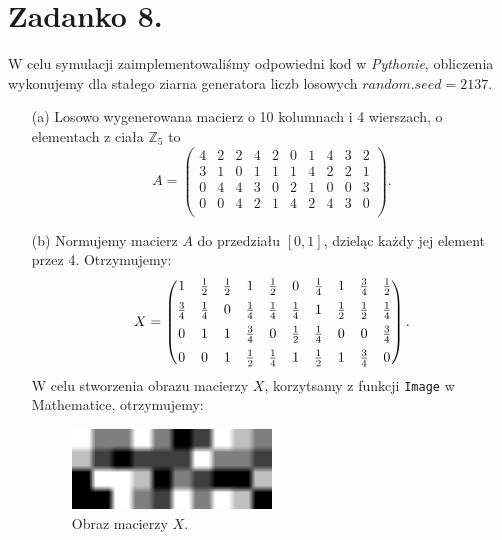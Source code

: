 \documentclass[10pt]{article} %
\begin{document}
\section*{Zadanko 8.}
W celu symulacji zaimplementowaliśmy odpowiedni kod w \textit{Pythonie}, obliczenia wykonujemy dla stałego ziarna generatora liczb losowych $random.seed = 2137$.
\begin{enumerate}

\item[(a)] Losowo wygenerowana macierz o 10 kolumnach i 4 wierszach, o elementach z ciała $\mathbb{Z}_5$ to $$A = \begin{pmatrix} 4&2&2&4&2&0&1&4&3&2\\
3&1&0&1&1&1&4&2&2&1\\
0&4&4&3&0&2&1&0&0&3\\
0&0&4&2&1&4&2&4&3&0\\
\end{pmatrix}.$$

\item[(b)] Normujemy macierz $A$ do przedziału $[0,1]$, dzieląc każdy jej element przez 4. Otrzymujemy:
$$X = \begin{pmatrix} \vspace{5pt} 1&\frac{1}{2}&\frac{1}{2}&1&\frac{1}{2}&0&\frac{1}{4}&1&\frac{3}{4}&\frac{1}{2}\\ \vspace{5pt}
\frac{3}{4}&\frac{1}{4}&0&\frac{1}{4}&\frac{1}{4}&\frac{1}{4}&1&\frac{1}{2}&\frac{1}{2}&\frac{1}{4}\\ \vspace{5pt}
0&1&1&\frac{3}{4}&0&\frac{1}{2}&\frac{1}{4}&0&0&\frac{3}{4}\\
0&0&1&\frac{1}{2}&\frac{1}{4}&1&\frac{1}{2}&1&\frac{3}{4}&0\\ \end{pmatrix}.$$ 
W celu stworzenia obrazu macierzy $X$, korzytsamy z funkcji \verb|Image| w Mathematice, otrzymujemy:\\

\begin{figure}[h]
	\centering
    \includegraphics[width=0.5\textwidth]{image.png}
    \caption{Obraz macierzy $X$.}
    \label{fig:example}
\end{figure}


\end{enumerate}
\end{document}

